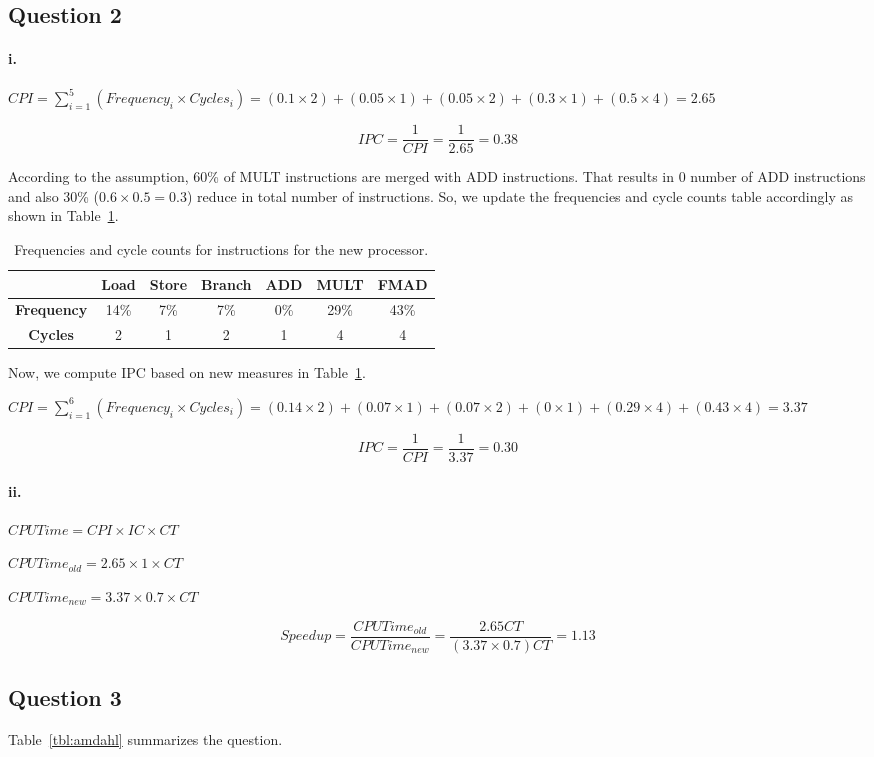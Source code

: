 \documentclass[11pt]{article}
\newcommand{\q}[1]{\subsection*{Question {#1}}}
\renewcommand{\part}[1]{\paragraph*{{#1}.}}
\begin{document}
\q{2}
\part{i} 
$
CPI = \sum \limits_{i=1}^{5} (Frequency_i \times Cycles_i) = 
(0.1 \times 2) + (0.05 \times 1) + (0.05 \times 2) + (0.3 \times 1) + 
(0.5 \times 4) = 2.65
$

$$
IPC = \frac{1}{CPI} = \frac{1}{2.65} = 0.38
$$

According to the assumption, 60\% of MULT instructions are merged with ADD 
instructions. That results in 0 number of ADD instructions and also 30\% 
($0.6 \times 0.5 = 0.3$) reduce in total number of instructions. So, we update 
the frequencies and cycle counts table accordingly as shown in 
Table~\ref{tbl:newfreq}.

\begin{table}[h]
\center
\begin{tabular}{|c|c|c|c|c|c|c|}
	\hline
	 & \textbf{Load} & \textbf{Store} & \textbf{Branch} & \textbf{ADD} & 
	 \textbf{MULT} & \textbf{FMAD} \\
	\hline
	\textbf{Frequency} & 14\% & 7\% & 7\% & 0\% & 29\% & 43\% \\
	\hline
	\textbf{Cycles} & 2 & 1 & 2 & 1 & 4 & 4 \\
	\hline
\end{tabular}
\caption{Frequencies and cycle counts for instructions for the new processor.}
\label{tbl:newfreq}
\end{table}

Now, we compute IPC based on new measures in Table~\ref{tbl:newfreq}.

$
CPI = \sum \limits_{i=1}^{6} (Frequency_i \times Cycles_i) = 
(0.14 \times 2) + (0.07 \times 1) + (0.07 \times 2) + (0 \times 1) + 
(0.29 \times 4) + (0.43 \times 4) = 3.37
$

$$
IPC = \frac{1}{CPI} = \frac{1}{3.37} = 0.30
$$

\part{ii} 
$CPUTime = CPI \times IC \times CT$

$CPUTime_{old} = 2.65 \times 1 \times CT$

$CPUTime_{new} = 3.37 \times 0.7 \times CT$

\[
Speedup = \frac{CPUTime_{old}}{CPUTime_{new}} = \frac{2.65 CT}{(3.37 
\times 0.7) CT} = 1.13
\]


\q{3} Table~\ref{tbl:amdahl} summarizes the question. 
\end{document}
